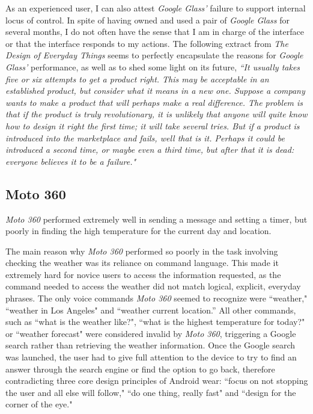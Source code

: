 \documentclass[11pt,a4paper]{scrartcl}
\begin{document}
As an experienced user, I can also attest \textit{Google Glass'} failure to support internal locus of control. In spite of having owned and used a pair of \textit{Google Glass} for several months, I do not often have the sense that I am in charge of the interface or that the interface responds to my actions.  
The following extract from \textit{The Design of Everyday Things} seems to perfectly encapsulate the reasons for \textit{Google Glass'} performance, as well as to shed some light on its future, \textit{``It usually takes five or six attempts to get a product right. This may be acceptable in an established product, but consider what it means in a new one. Suppose a company wants to make a product that will perhaps make a real difference. The problem is that if the product is truly revolutionary, it is unlikely that anyone will quite know how to design it right the first time; it will take several tries. But if a product is introduced into the marketplace and fails, well that is it. Perhaps it could be introduced a second time, or maybe even a third time, but after that it is dead: everyone believes it to be a failure."}
\cite{norman02} %

\subsection{Moto 360}
\textit{Moto 360} performed extremely well in sending a message and setting a timer, but poorly in finding the high temperature for the current day and location. 

The main reason why \textit{Moto 360} performed so poorly in the task involving checking the weather was its reliance on command language. This made it extremely hard for novice users to access the information requested, as the command needed to access the weather did not match logical, explicit, everyday phrases. The only voice commands \textit{Moto 360} seemed to recognize were ``weather," ``weather in Los Angeles" and ``weather current location.” All other commands, such as ``what is the weather like?", ``what is the highest temperature for today?" or ``weather forecast" were considered invalid by \textit{Moto 360}, triggering a Google search rather than retrieving the weather information. Once the Google search was launched, the user had to give full attention to the device to try to find an answer through the search engine or find the option to go back, therefore contradicting three core design principles of Android wear: ``focus on not stopping the user and all else will follow," ``do one thing, really fast" and ``design for the corner of the eye."\cite{moto360}
\end{document}
